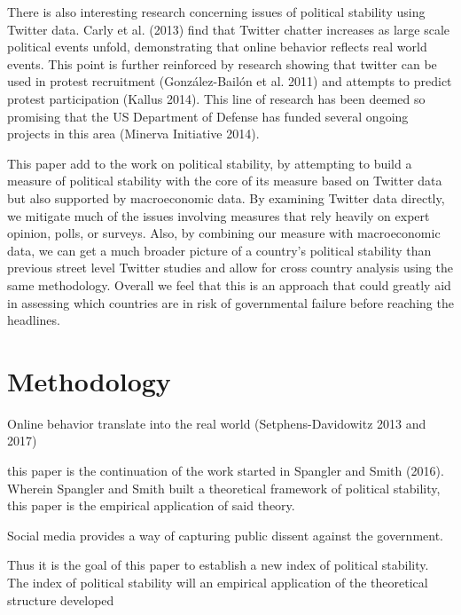 \documentclass[12pt]{article}
\begin{document}
\begin{spacing}{1.5}
There is also interesting research concerning issues of political stability using Twitter data. Carly et al. (2013) find that Twitter chatter increases as large scale political events unfold, demonstrating that online behavior reflects real world events. This point is further reinforced by research showing that twitter can be used in protest recruitment (Gonz{\'a}lez-Bail{\'o}n et al. 2011) and attempts to predict protest participation (Kallus 2014). This line of research has been deemed so promising that the US Department of Defense has funded several ongoing projects in this area (Minerva Initiative 2014).  

This paper add to the work on political stability, by attempting to build a measure of political stability with the core of its measure based on Twitter data but also supported by macroeconomic data. By examining Twitter data directly, we mitigate much of the issues involving measures that rely heavily on expert opinion, polls, or surveys. Also, by combining our measure with macroeconomic data, we can get a much broader picture of a country's political stability than previous street level Twitter studies and allow for cross country analysis using the same methodology. Overall we feel that this is an approach that could greatly aid in assessing which countries are in risk of governmental failure before reaching the headlines.      

\section*{Methodology}













Online behavior translate into the real world (Setphens-Davidowitz 2013 and 2017) 








this paper is the continuation of the work started in Spangler and Smith (2016). Wherein Spangler and Smith built a theoretical framework of political stability, this paper is the empirical application of said theory. 

Social media provides a way of capturing public dissent against the government.   

Thus it is the goal of this paper to establish a new index of political stability. The index of political stability will an empirical application of the theoretical structure developed 





\end{spacing}
\end{document}
